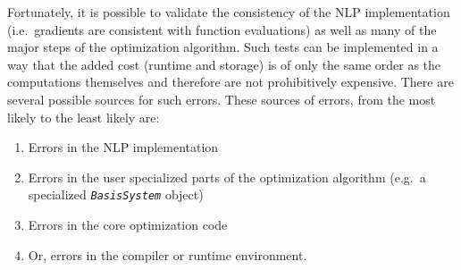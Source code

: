\documentclass[pdf,ps2pdf,11pt]{SANDreport}
\begin{document}
Fortunately, it is possible to validate the consistency of the NLP
implementation (i.e.~gradients are consistent with function evaluations) as
well as many of the major steps of the optimization algorithm.  Such tests can
be implemented in a way that the added cost (runtime and storage) is of only
the same order as the computations themselves and therefore are not
prohibitively expensive.  There are several possible sources for such errors.
These sources of errors, from the most likely to the least likely are:

\begin{enumerate}
\item Errors in the NLP implementation
\item Errors in the user specialized parts of the optimization algorithm
(e.g.~a specialized {}\texttt{\textit{BasisSystem}} object)
\item Errors in the core optimization code
\item Or, errors in the compiler or runtime environment.
\end{enumerate}
\end{document}
